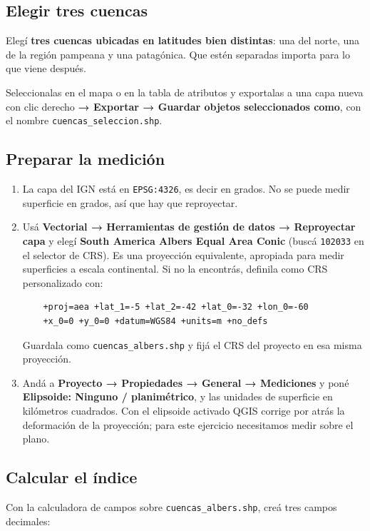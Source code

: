 \documentclass{article}
\begin{document}
\subsection{Elegir tres cuencas}

Elegí \textbf{tres cuencas ubicadas en latitudes bien distintas}: una del norte, una de la región pampeana y una patagónica. Que estén separadas importa para lo que viene después.

Seleccionalas en el mapa o en la tabla de atributos y exportalas a una capa nueva con clic derecho \textbf{→ Exportar → Guardar objetos seleccionados como}, con el nombre \texttt{cuencas\_seleccion.shp}.

\subsection{Preparar la medición}

\begin{enumerate}
    \item La capa del IGN está en \texttt{EPSG:4326}, es decir en grados. No se puede medir superficie en grados, así que hay que reproyectar.
    \item Usá \textbf{Vectorial → Herramientas de gestión de datos → Reproyectar capa} y elegí \textbf{South America Albers Equal Area Conic} (buscá \texttt{102033} en el selector de CRS). Es una proyección equivalente, apropiada para medir superficies a escala continental. Si no la encontrás, definila como CRS personalizado con:
    \begin{verbatim}
    +proj=aea +lat_1=-5 +lat_2=-42 +lat_0=-32 +lon_0=-60
    +x_0=0 +y_0=0 +datum=WGS84 +units=m +no_defs
    \end{verbatim}
    Guardala como \texttt{cuencas\_albers.shp} y fijá el CRS del proyecto en esa misma proyección.
    \item Andá a \textbf{Proyecto → Propiedades → General → Mediciones} y poné \textbf{Elipsoide: Ninguno / planimétrico}, y las unidades de superficie en kilómetros cuadrados. Con el elipsoide activado QGIS corrige por atrás la deformación de la proyección; para este ejercicio necesitamos medir sobre el plano.
\end{enumerate}

\subsection{Calcular el índice}

Con la calculadora de campos sobre \texttt{cuencas\_albers.shp}, creá tres campos decimales:
\end{document}

